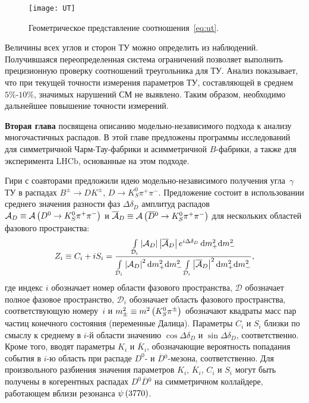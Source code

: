 \documentclass[a4paper,14pt]{extarticle} %
\newcommand{\dn}{\ensuremath{D^0}\xspace}
\newcommand{\dbar}{\ensuremath{\overline{D}}\xspace}
\newcommand{\dnbar}{\ensuremath{\dbar{}^0}\xspace}
\newcommand{\ks}{\ensuremath{K_S^0}\xspace}
\newcommand{\gphi}{\ensuremath{\gamma}\xspace}
\newcommand{\lbr}{\ensuremath{\left(}}
\newcommand{\rbr}{\ensuremath{\right)}}
\newcommand{\bdk}{\ensuremath{B^{\pm}\to D K^{\pm}}\xspace}
\newcommand{\deld}{\ensuremath{\Delta\delta_D}\xspace}
\newcommand{\dd}{\ensuremath{\mathrm{d}}\xspace}
\newcommand{\ddlz}{\dd\mpsq\dd\mmsq}
\newcommand{\dkpp}{\ensuremath{D\to\ks\pi^+\pi^-}\xspace}
\newcommand{\dnkpp}{\ensuremath{\dn\to\ks\pi^+\pi^-}\xspace}
\newcommand{\dbkpp}{\ensuremath{\dnbar\to\ks\pi^+\pi^-}\xspace}
\newcommand{\ppsi}{\ensuremath{\psi\lbr3770\rbr}\xspace}
\newcommand{\mpsq}{\ensuremath{m_+^2}\xspace}
\newcommand{\mmsq}{\ensuremath{m_-^2}\xspace}
\newcommand{\mcd}{\ensuremath{\mathcal{D}}\xspace}
\newcommand{\mca}{\ensuremath{\mathcal{A}}\xspace}
\newcommand{\mcabar}{\ensuremath{\overline{\mca}}\xspace}
\newcommand{\ad}{\ensuremath{\mca_D}}
\newcommand{\adbar}{\ensuremath{\mcabar_D}}
\newcommand{\ddlzarea}{\ensuremath{\limits_{\mcd_i}}\xspace}
\newcommand{\ut}{\ensuremath{\textrm{ТУ}}\xspace}
\newcommand{\ki}{\ensuremath{K_i}\xspace}
\newcommand{\ci}{\ensuremath{C_i}\xspace}
\newcommand{\zi}{\ensuremath{Z_i}\xspace}
\newcommand{\si}{\ensuremath{S_i}\xspace}
\newcommand{\kb}{\ensuremath{\overline{K}}\xspace}
\newcommand{\kbi}{\ensuremath{\kb_{i}}\xspace}
\newcommand{\lhcb}{\ensuremath{\mathrm{LHCb}}\xspace}
\begin{document}
\begin{figure}[h]
 \centering
  \texttt{[image: UT]}
   \caption{Геометрическое представление соотношения~\eqref{eq:ut}.}
  \label{fig:UT}
\end{figure}

Величины всех углов и сторон \ut можно определить из наблюдений. Получившаяся переопределенная система ограничений позволяет выполнить прецизионную проверку соотношений треугольника для \ut.  Анализ показывает, что при текущей точности измерения параметров \ut, составляющей в среднем $5\%$-$10\%$, значимых нарушений СМ не выявлено.  Таким образом, необходимо дальнейшее повышение точности измерений.


{\textbf{Вторая глава}} посвящена описанию модельно-независимого подхода к анализу многочастичных распадов.  В этой главе предложены программы исследований для симметричной Чарм-Тау-фабрики и асимметричной $B$-фабрики, а также для эксперимента \lhcb, основанные на этом подходе.  

Гири с соавторами предложили идею модельно-независимого получения угла~\gphi~\ut в распадах \bdk, \dkpp.  Предложение состоит в использовании среднего значения разности фаз $\deld$ амплитуд распадов $\ad\equiv\mca\lbr\dnkpp\rbr$ и $\adbar\equiv\mca\lbr\dbkpp\rbr$ для нескольких областей фазового пространства:
\begin{equation}\label{eq:csi}
  \zi \equiv \ci + i\si = 
            \frac{\int\ddlzarea
            \left|\ad\right|\left|\adbar\right|
            e^{i\deld}\,\ddlz}
            {\int\ddlzarea\left|\ad\right|^2 \ddlz 
             \int\ddlzarea\left|\adbar\right|^2 \ddlz}
            ,
\end{equation}
где индекс $i$ обозначает номер области фазового пространства, $\mcd$ обозначает полное фазовое пространство, $\mcd_i$ обозначает область фазового пространства, соответствующую номеру~$i$ и $m^2_{\pm}\equiv m^2\lbr\ks\pi^{\pm}\rbr$ обозначают квадраты масс пар частиц конечного состояния (переменные Далица).  Параметры \ci и \si близки по смыслу к среднему в $i$-й области значению $\cos\deld$ и $\sin\deld$, соответственно.  Кроме того, вводят параметры \ki и \kbi,  обозначающие вероятность попадания события в $i$-ю область при распаде \dn- и \dnbar-мезона, соответственно.  Для произвольного разбиения значения параметров \ki, \kbi, \ci и \si могут быть получены в когерентных распадах $\dn\dnbar$ на симметричном коллайдере, работающем вблизи резонанса \ppsi.
\end{document}
